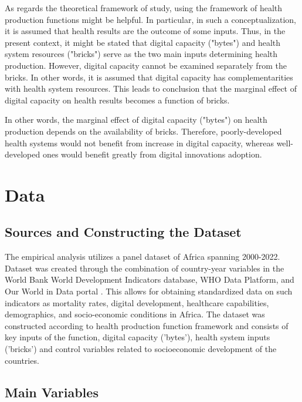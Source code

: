 \documentclass[12pt]{article}
\begin{document}
\medskip
As regards the theoretical framework of study, using the framework of health production functions might be helpful. In particular, in such a conceptualization, it is assumed that health results are the outcome of some inputs. Thus, in the present context, it might be stated that digital capacity ("bytes") and health system resources ("bricks") serve as the two main inputs determining health production. However, digital capacity cannot be examined separately from the bricks. In other words, it is assumed that digital capacity has complementarities with health system resources. This leads to conclusion that the marginal effect of digital capacity on health results becomes a function of bricks.

\medskip
In other words, the marginal effect of digital capacity ("bytes") on health production depends on the availability of bricks. Therefore, poorly-developed health systems would not benefit from increase in digital capacity, whereas well-developed ones would benefit greatly from digital innovations adoption.
\section{Data}

\subsection{Sources and Constructing the Dataset}

The empirical analysis utilizes a panel dataset of Africa spanning 2000-2022. Dataset was created through the combination of country-year variables in the World Bank World Development Indicators database, WHO Data Platform, and Our World in Data portal \citep{worldbank_wdi, who_data, owid_data}. This allows for obtaining standardized data on such indicators as mortality rates, digital development, healthcare capabilities, demographics, and socio-economic conditions in Africa. The dataset was constructed according to health production function framework and consists of key inputs of the function, digital capacity ('bytes'), health system inputs ('bricks') and control variables related to socioeconomic development of the countries.

\subsection{Main Variables}
\end{document}
